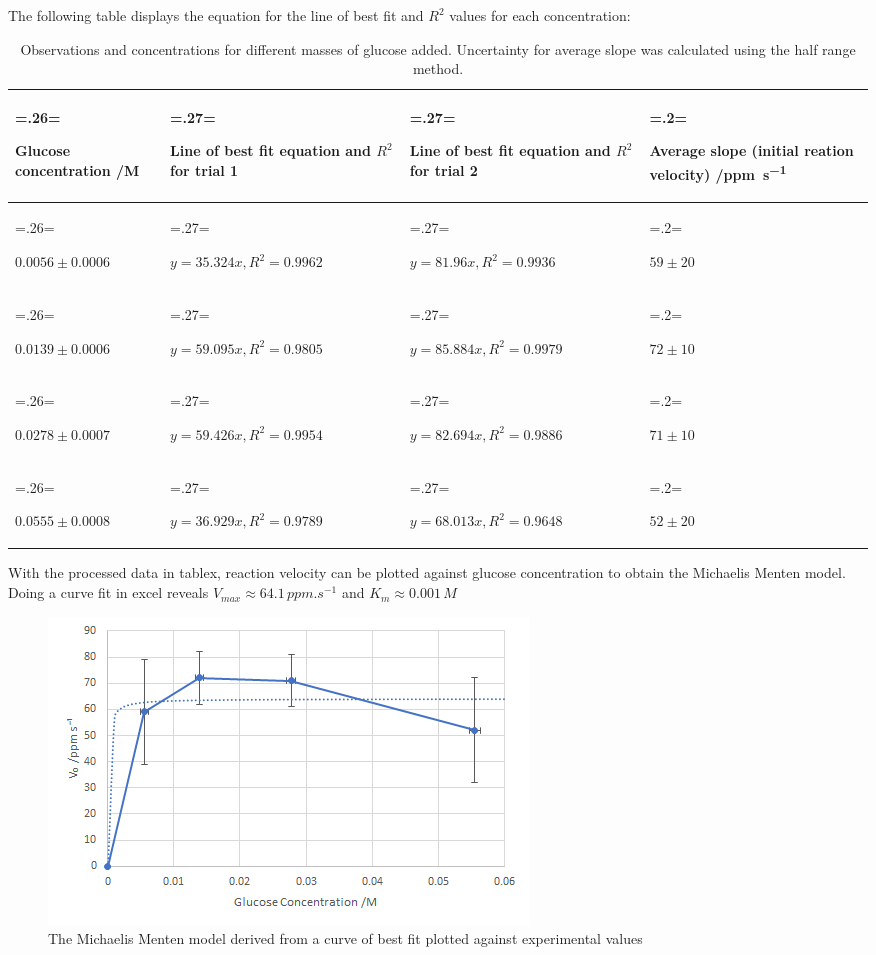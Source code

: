 \documentclass{article}
\begin{document}
The following table displays the equation for the line of best fit and $R^2$ values for each concentration:
\begin{table}[H]
\centering
\caption{Observations and concentrations for different masses of glucose added. Uncertainty for average slope was calculated using the half range method.}
\label{table:5}
\begin{tabularx}{\textwidth} {
    | >{\hsize=.26\hsize \linewidth=\hsize \raggedright\arraybackslash}X
    | >{\hsize=.27\hsize \linewidth=\hsize \raggedright\arraybackslash}X
    | >{\hsize=.27\hsize \linewidth=\hsize \raggedright\arraybackslash}X
    | >{\hsize=.2\hsize \linewidth=\hsize \raggedright\arraybackslash}X |}
    \hline
    \textbf{Glucose concentration /\si{M}} & \textbf{Line of best fit equation and $R^2$ for trial 1} & \textbf{Line of best fit equation and $R^2$ for trial 2} & \textbf{Average slope (initial reation velocity) /\si{ppm.s^{-1}}} \\
    \hline
    $0.0056 \pm 0.0006$ & $y=35.324x, R^2=0.9962$ & $y=81.96x, R^2=0.9936$ & $59 \pm 20$ \\
    \hline
    $0.0139 \pm 0.0006$ & $y=59.095x, R^2=0.9805$ & $y=85.884x, R^2=0.9979$ & $72 \pm 10$ \\
    \hline
    $0.0278 \pm 0.0007$ & $y=59.426x, R^2=0.9954$ & $y=82.694x, R^2=0.9886$ & $71 \pm 10$ \\
    \hline
    $0.0555 \pm 0.0008$ & $y=36.929x, R^2=0.9789$ & $y=68.013x, R^2=0.9648$ & $52 \pm 20$ \\
    \hline
\end{tabularx}
\end{table}

\newpage

With the processed data in tablex, reaction velocity can be plotted against glucose concentration to obtain the Michaelis Menten model. Doing a curve fit in excel reveals $V_{max} \approx 64.1\,\si{ppm.s^{-1}}$ and $K_m \approx 0.001\,\si{M}$
\begin{figure}[H]
    \renewcommand{\figurename}{Graph}
    \setcounter{figure}{4}
    \centering
    \includegraphics{figures/graph_05.png}
    \vspace*{-12pt}
    \caption{The Michaelis Menten model derived from a curve of best fit plotted against experimental values}
    \label{fig:graph5}
\end{figure}
\end{document}
